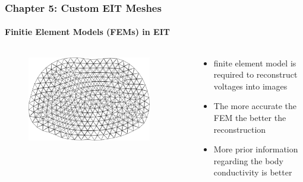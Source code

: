 \documentclass[10pt,    %
    english,            %
    xcolor=table,       %
    envcountsect,        %
    aspectratio=1610
]{beamer}
\begin{document}
\begin{frame}
	\frametitle{Chapter 5: Custom EIT Meshes}
	\framesubtitle{Finitie Element Models (FEMs) in EIT}    
	\begin{columns}[c]
		\begin{column}{0.5\textwidth}
			\begin{figure}[H]
				\centering
				\includegraphics[width=0.9\textwidth]{human_mesh_empty.png}
			\end{figure}
		\end{column}
		\begin{column}{0.5\textwidth}
			\begin{itemize}
				\item finite element model is required to reconstruct voltages into images
				\item \alert{The more accurate the FEM the better the reconstruction} 
				\item More prior information regarding the body conductivity is better
			\end{itemize}
		\end{column}
	\end{columns}
\end{frame}
\end{document}
